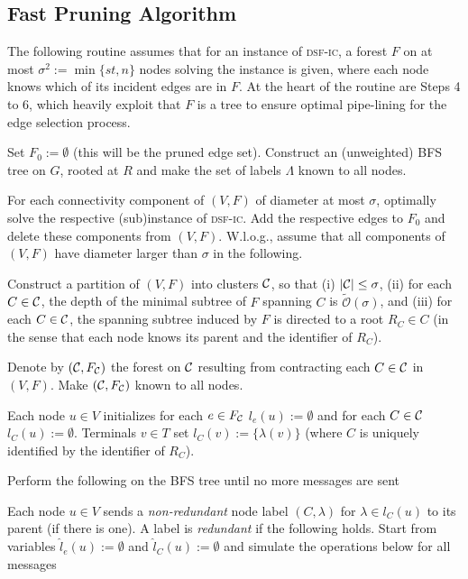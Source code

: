 \documentclass[letterpaper,11pt]{article}
\newcommand{\sO}{\tilde{\mathcal{O}}}
\newcommand{\Comp}{\lambda}
\newcommand{\sfic}{\textsc{dsf-ic}\xspace}
\begin{document}
\subsection{Fast Pruning Algorithm}
\label{app:prune}
The following routine assumes that for an instance of \sfic, a forest $F$ on at
most $\sigma^2:=\min\{st,n\}$ nodes solving the instance is given, where each
node knows which of its incident edges are in $F$. At the heart of the routine
are Steps 4 to 6, which heavily exploit that $F$ is a tree to ensure optimal
pipe-lining for the edge selection process.
\begin{compactenum}
\item Set $F_0:=\emptyset$ (this will be the pruned edge set). Construct an
(unweighted) BFS tree on $G$, rooted at $R$ and make the set of labels $\Lambda$
known to all nodes.
\item For each connectivity component of $(V,F)$ of diameter at most $\sigma$,
optimally solve the respective (sub)instance of \sfic. Add the respective edges
to $F_0$ and delete these components from $(V,F)$. W.l.o.g., assume that all
components of $(V,F)$ have diameter larger than $\sigma$ in the following.
\item Construct a partition of $(V,F)$ into clusters ${\cal C}$, so that
(i) $|{\cal C}|\leq \sigma$, (ii) for each $C\in {\cal C}$, the depth of the
minimal subtree of $F$ spanning $C$ is $\sO(\sigma)$, and (iii) for each $C\in
{\cal C}$, the spanning subtree induced by $F$ is directed to a root $R_C\in C$
(in the sense that each node knows its parent and the identifier of $R_C$).
\item Denote by $({\cal C},F_{\cal C})$ the
forest on ${\cal C}$ resulting from contracting each $C\in {\cal C}$ in $(V,F)$.
Make $({\cal C},F_{\cal C})$ known to all nodes.
\item Each node $u\in V$ initializes for each $e\in F_{\cal C}$
$l_e(u):=\emptyset$ and for each $C\in {\cal C}$ $l_C(u):=\emptyset$. Terminals
$v\in T$ set $l_C(v):=\{\Comp(v)\}$ (where $C$ is uniquely identified by the
identifier of $R_C$).
\item Perform the following on the BFS tree until no more messages are sent
\begin{compactitem}
\item Each node $u\in V$ sends a \emph{non-redundant} node label $(C,\Comp)$ for
$\Comp\in l_C(u)$ to its parent (if there is one). A label is \emph{redundant}
if the following holds. Start from variables $\hat{l}_e(u):=\emptyset$ and
$\hat{l}_C(u):=\emptyset$ and simulate the operations below for all messages

\end{compactitem}
\end{compactenum}
\end{document}
